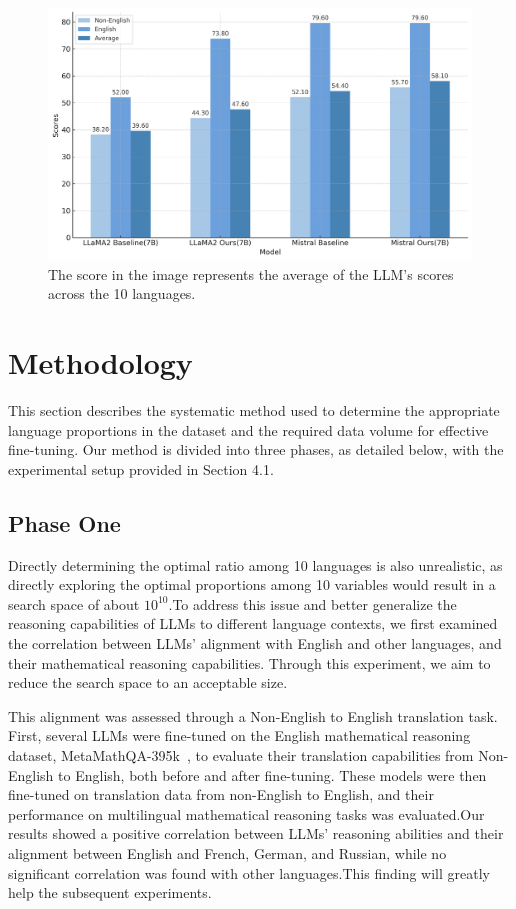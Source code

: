 \documentclass[11pt]{article}
\begin{document}
\begin{figure}[h]
\begin{center}
\includegraphics[width=0.8\linewidth]{picture/figure8_code.png}
\end{center}
\caption{The score in the image represents the average of the LLM's scores across the 10 languages.}
\end{figure}


\section{Methodology}
This section describes the systematic method used to determine the appropriate language proportions in the dataset and the required data volume for effective fine-tuning. Our method is divided into three phases, as detailed below, with the experimental setup provided in Section 4.1.

\subsection{Phase One}
Directly determining the optimal ratio among 10 languages is also unrealistic, as directly exploring the optimal proportions among 10 variables would result in a search space of about \(10^{10}\).To address this issue and better generalize the reasoning capabilities of LLMs to different language contexts, we first examined the correlation between LLMs' alignment with English and other languages, and their mathematical reasoning capabilities. Through this experiment, we aim to reduce the search space to an acceptable size.

 This alignment was assessed through a Non-English to English translation task. First, several LLMs were fine-tuned on the English mathematical reasoning dataset, MetaMathQA-395k~\citep{yu2024metamath}, to evaluate their translation capabilities from Non-English to English, both before and after fine-tuning. These models were then fine-tuned on translation data from non-English to English, and their performance on multilingual mathematical reasoning tasks was evaluated.Our results showed a positive correlation between LLMs' reasoning abilities and their alignment between English and French, German, and Russian, while no significant correlation was found with other languages.This finding will greatly help the subsequent experiments.
\end{document}
